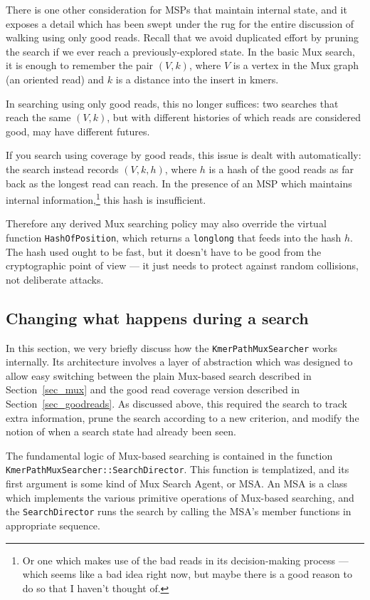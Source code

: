 \documentclass[11pt]{article}
\begin{document}
There is one other consideration for MSPs that maintain internal state, and it exposes
a detail which has been swept under the rug for the entire discussion of walking using
only good reads.  Recall that we avoid duplicated effort by pruning the search if we 
ever reach a previously-explored state.  In the basic Mux search, it is enough to
remember the pair $(V,k)$, where $V$ is a vertex in the Mux graph (an oriented read)
and $k$ is a distance into the insert in kmers.

In searching using only good reads, this no longer suffices: two searches that reach
the same $(V,k)$, but with different histories of which reads are considered good, may
have different futures.

If you search using coverage by good reads, this issue is dealt with automatically:
the search instead records $(V,k,h)$, where $h$ is a hash of the good reads as far
back as the longest read can reach.  In the presence of an MSP which
maintains internal information,\footnote{Or one which makes use of the bad reads in
its decision-making process --- which seems like a bad idea right now, but maybe there
is a good reason to do so that I haven't thought of.} this hash is insufficient.

Therefore any derived Mux searching policy may also override the virtual function
{\tt HashOfPosition}, which returns a {\tt longlong} that feeds into the hash $h$.  The
hash used ought to be fast, but it doesn't have to be good from the cryptographic point 
of view --- it just needs to protect against random collisions, not deliberate attacks.



\subsection{Changing what happens during a search}
\label{sec_template}

In this section, we very briefly discuss how the {\tt KmerPathMuxSearcher} works internally.
Its architecture involves a layer of abstraction which was designed to allow easy
switching between the plain Mux-based search described in Section~\ref{sec_mux}
and the good read coverage version described in Section~\ref{sec_goodreads}.
As discussed above, this required the search to track extra information, prune the
search according to a new criterion, and modify the notion of when a search state
had already been seen.

The fundamental logic of Mux-based searching is contained in the function
{\tt KmerPathMuxSearcher::SearchDirector}.  This function is templatized, and
its first argument is some kind of Mux Search Agent, or MSA.  An MSA
is a class which implements the various primitive operations of Mux-based
searching, and the {\tt SearchDirector} runs the search by calling the MSA's
member functions in appropriate sequence.
\end{document}
